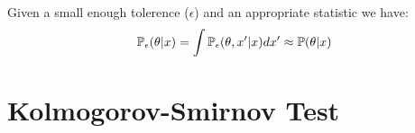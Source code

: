 Given a small enough tolerence ($\epsilon$) and an appropriate statistic we have:
\begin{equation}
    \label{Model_Selection:Approximate_Bayesian_Computation:posterior_convergence}
    \mathbb{P}_{\epsilon}(\theta|x) = \int \mathbb{P}_{\epsilon}(\theta, x'|x)dx' \approx \mathbb{P}(\theta|x)
\end{equation}

\begin{example}
    
\end{example}




\section{Kolmogorov-Smirnov Test}
\label{Model_Selection:Kolmogorov_Smirnov_Test}


